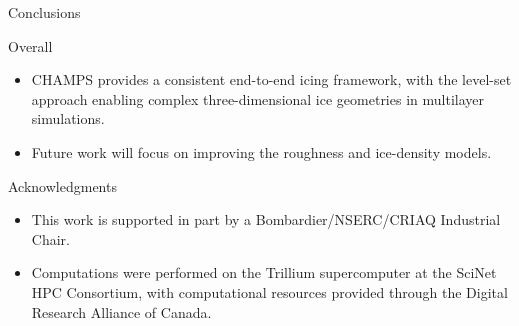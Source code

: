 \begin{frame}{\small Conclusions}
\vspace{0.12cm}

\begin{alertblock}{\scriptsize Overall}
\begin{itemize}
    \item CHAMPS provides a consistent end-to-end icing framework, with the level-set approach enabling complex three-dimensional ice geometries in multilayer simulations.
    \item Future work will focus on improving the roughness and ice-density models.
\end{itemize}
\end{alertblock}

\end{frame}


\begin{frame}{\small Acknowledgments}
\scriptsize

\begin{itemize}
    \item This work is supported in part by a Bombardier/NSERC/CRIAQ Industrial Chair.

    \item Computations were performed on the Trillium supercomputer at the SciNet HPC Consortium, with computational resources provided through the Digital Research Alliance of Canada.

\end{itemize}

\end{frame}